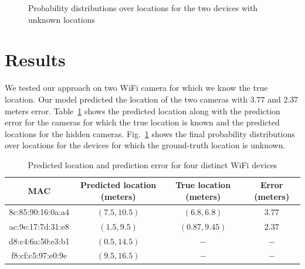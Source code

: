 \documentclass{article}
\begin{document}
\begin{figure}[t]
    \centering
    \qquad
    \caption{Probability distributions over locations for the two devices with unknown locations}%
    \label{fig:pdists_hidden_cameras}%
\end{figure}

\section{Results}
\vspace{-.3cm}
We tested our approach on two WiFi camera for which we know the true location. Our
model predicted the location of the two cameras with $3.77$ and $2.37$ meters error.
Table~\ref{tab:results} shows the predicted location along with the prediction error for the
cameras for which the true location is known and the predicted locations for the hidden cameras.
Fig.~\ref{fig:pdists_hidden_cameras} shows the final probability distributions over locations for the
devices for which the ground-truth location is unknown.

\begin{table}[h]
\centering
\begin{tabular}{ |c|c|c|c| } 
 \hline
 MAC & Predicted location (meters) & True location (meters) & Error (meters) \\ 
 \hline
 8c:85:90:16:0a:a4 & $(7.5, 10.5)$ & $(6.8, 6.8)$ & $3.77$\\ 
 ac:9e:17:7d:31:e8 & $(1.5, 9.5)$ & $(0.87, 9.45)$ & $2.37$ \\ 
 d8:c4:6a:50:e3:b1 & $(0.5, 14.5)$ & $-$ & $-$ \\
 f8:cf:c5:97:e0:9e & $(9.5, 16.5)$ & $-$ & $-$ \\
 \hline
\end{tabular}
 \caption{Predicted location and prediction error for four distinct WiFi devices \label{tab:results}}
\end{table}
\end{document}

